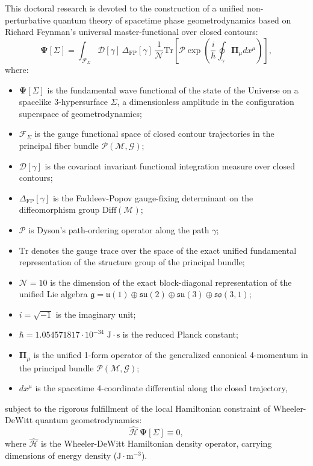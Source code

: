 \documentclass[11pt,a4paper]{article}
\theoremstyle{definition}
\begin{document}
This doctoral research is devoted to the construction of a unified non-perturbative quantum theory of spacetime phase geometrodynamics based on Richard Feynman's universal master-functional over closed contours:
\begin{equation}\label{eq:0.1}\tag{0.1}
\mathbf{\Psi}[\Sigma] = \int_{\mathcal{F}_\Sigma} \mathcal{D}[\gamma] \, \Delta_{\text{FP}}[\gamma] \, \frac{1}{\mathcal{N}} \text{Tr}\left[ \mathcal{P}\exp\left( \frac{i}{\hbar} \oint_{\gamma} \mathbf{\Pi}_\mu dx^\mu \right) \right],
\end{equation}
where:
\begin{itemize}
\item $\mathbf{\Psi}[\Sigma]$ is the fundamental wave functional of the state of the Universe on a spacelike 3-hypersurface $\Sigma$, a dimensionless amplitude in the configuration superspace of geometrodynamics;
\item $\mathcal{F}_\Sigma$ is the gauge functional space of closed contour trajectories in the principal fiber bundle $\mathcal{P}(\mathcal{M}, \mathcal{G})$;
\item $\mathcal{D}[\gamma]$ is the covariant invariant functional integration measure over closed contours;
\item $\Delta_{\text{FP}}[\gamma]$ is the Faddeev-Popov gauge-fixing determinant on the diffeomorphism group $\text{Diff}(\mathcal{M})$;
\item $\mathcal{P}$ is Dyson's path-ordering operator along the path $\gamma$;
\item $\text{Tr}$ denotes the gauge trace over the space of the exact unified fundamental representation of the structure group of the principal bundle;
\item $\mathcal{N} = 10$ is the dimension of the exact block-diagonal representation of the unified Lie algebra $\mathfrak{g} = \mathfrak{u}(1) \oplus \mathfrak{su}(2) \oplus \mathfrak{su}(3) \oplus \mathfrak{so}(3,1)$;
\item $i = \sqrt{-1}$ is the imaginary unit;
\item $\hbar = 1.054571817 \cdot 10^{-34}\text{ J}\cdot\text{s}$ is the reduced Planck constant;
\item $\mathbf{\Pi}_\mu$ is the unified 1-form operator of the generalized canonical 4-momentum in the principal bundle $\mathcal{P}(\mathcal{M}, \mathcal{G})$;
\item $dx^\mu$ is the spacetime 4-coordinate differential along the closed trajectory,
\end{itemize}
subject to the rigorous fulfillment of the local Hamiltonian constraint of Wheeler-DeWitt quantum geometrodynamics:
\begin{equation}\label{eq:0.2}\tag{0.2}
\hat{\mathcal{H}} \, \mathbf{\Psi}[\Sigma] \equiv 0,
\end{equation}
where $\hat{\mathcal{H}}$ is the Wheeler-DeWitt Hamiltonian density operator, carrying dimensions of energy density ($\text{J}\cdot\text{m}^{-3}$).
\end{document}
